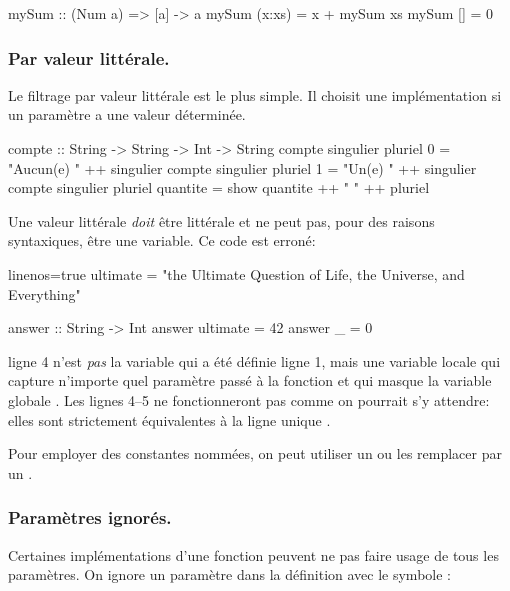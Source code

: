 \begin{haskellcode}
mySum :: (Num a) => [a] -> a
mySum (x:xs) = x + mySum xs
mySum []     = 0
\end{haskellcode}

\subsubsection{Par valeur littérale.}

Le filtrage par valeur littérale est le plus simple. Il choisit une implémentation si un paramètre a une valeur déterminée.

\begin{haskellcode}
compte :: String -> String -> Int -> String
compte singulier pluriel 0 = "Aucun(e) " ++ singulier
compte singulier pluriel 1 = "Un(e) " ++ singulier
compte singulier pluriel quantite = show quantite ++ " " ++  pluriel
\end{haskellcode}

\begin{warnbox}
Une valeur littérale \emph{doit} être littérale et ne peut pas, pour des raisons syntaxiques, être une variable. Ce code est erroné:

\begin{haskellcode*}{linenos=true}
ultimate = "the Ultimate Question of Life, the Universe, and Everything"

answer :: String -> Int
answer ultimate = 42
answer _ = 0
\end{haskellcode*}

 ligne 4 n'est \emph{pas} la variable qui a été définie ligne 1, mais une variable locale qui capture n'importe quel paramètre passé à la fonction et qui masque la variable globale . Les lignes 4--5 ne fonctionneront pas comme on pourrait s'y attendre: elles sont strictement équivalentes à la ligne unique .

Pour employer des constantes nommées, on peut utiliser un   ou les remplacer par un .
\end{warnbox}

\subsubsection{Paramètres ignorés.}

Certaines implémentations d'une fonction peuvent ne pas faire usage de tous les paramètres. On ignore un paramètre dans la définition avec le symbole \hs{_}:

